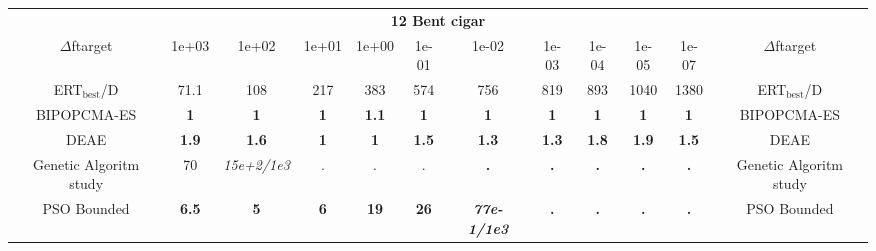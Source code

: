 \begin{tabular}{cccccccccccc}
 & \multicolumn{10}{c}{{\normalsize \textbf{12 Bent cigar}}}\\
$\Delta$ftarget& 1e+03& 1e+02& 1e+01& 1e+00& 1e-01& 1e-02& 1e-03& 1e-04& 1e-05& 1e-07 & $\Delta$ftarget \\
ERT$_{\textrm{best}}$/D& 71.1& 108& 217& 383& 574& 756& 819& 893& 1040& 1380 & ERT$_{\textrm{best}}$/D \\
\hline
BIPOPCMA-ES & \textbf{1} & \textbf{1} & \textbf{1} & \textbf{1.1} & \textbf{1} & \textbf{1} & \textbf{1} & \textbf{1} & \textbf{1} & \textbf{1} & BIPOPCMA-ES \cite{add_an_entry_for_BIPOPCMA-ES_in_bbob.bib}\\
DEAE & \textbf{1.9} & \textbf{1.6} & \textbf{1} & \textbf{1} & \textbf{1.5} & \textbf{1.3} & \textbf{1.3} & \textbf{1.8} & \textbf{1.9} & \textbf{1.5} & DEAE \cite{add_an_entry_for_DEAE_in_bbob.bib}\\
Genetic Algoritm study & 70 & \textit{15e+2}\textit{/1e3} & . & . & . & \textbf{.} & \textbf{.} & \textbf{.} & \textbf{.} & \textbf{.} & Genetic Algoritm study \cite{add_an_entry_for_Genetic Algoritm study_in_bbob.bib}\\
PSO Bounded & \textbf{6.5} & \textbf{5} & \textbf{6} & \textbf{19} & \textbf{26} & \textbf{\textit{77e-1}\textit{/1e3}} & \textbf{.} & \textbf{.} & \textbf{.} & \textbf{.} & PSO Bounded \cite{add_an_entry_for_PSO Bounded_in_bbob.bib}
\end{tabular}
